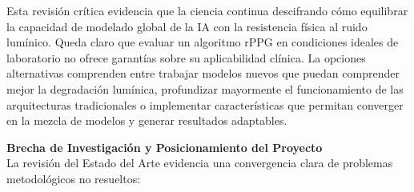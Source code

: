 Esta revisión crítica evidencia que la ciencia continua descifrando cómo equilibrar la capacidad de modelado global de la IA con la resistencia 
física al ruido lumínico. Queda claro que evaluar un algoritmo rPPG en condiciones ideales de laboratorio no ofrece garantías sobre su aplicabilidad clínica.
La opciones alternativas comprenden entre trabajar modelos nuevos que puedan comprender mejor la degradación lumínica, profundizar mayormente el funcionamiento
de las arquitecturas tradicionales o implementar características que permitan converger en la mezcla de modelos y generar resultados adaptables.

\textbf{Brecha de Investigación y Posicionamiento del Proyecto}\\

La revisión del Estado del Arte evidencia una convergencia clara de problemas metodológicos no resueltos:

